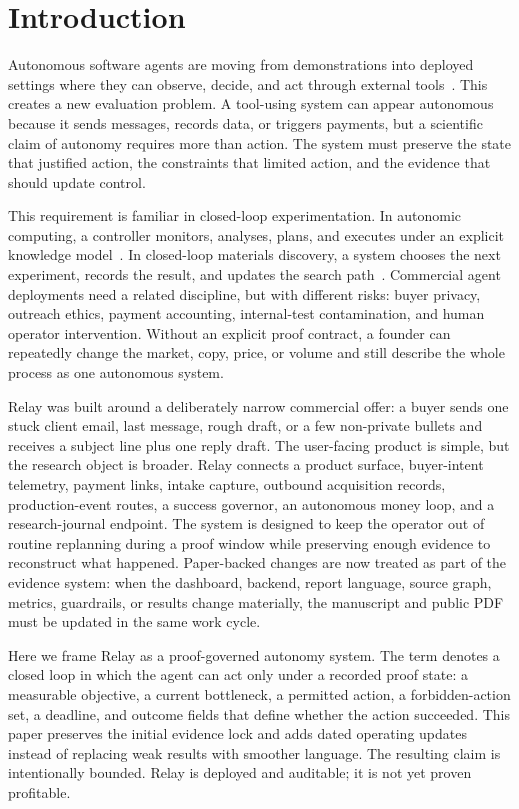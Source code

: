 \documentclass[12pt,letterpaper]{article}
\begin{document}
\section{Introduction}

Autonomous software agents are moving from demonstrations into deployed settings where they can observe, decide, and act through external tools~\cite{yao_react_2023,schick_toolformer_2023,park_generative_2023,wu_autogen_2023,wang_survey_2023}. This creates a new evaluation problem. A tool-using system can appear autonomous because it sends messages, records data, or triggers payments, but a scientific claim of autonomy requires more than action. The system must preserve the state that justified action, the constraints that limited action, and the evidence that should update control.

This requirement is familiar in closed-loop experimentation. In autonomic computing, a controller monitors, analyses, plans, and executes under an explicit knowledge model~\cite{kephart_vision_2003}. In closed-loop materials discovery, a system chooses the next experiment, records the result, and updates the search path~\cite{kusne_closed_loop_2020}. Commercial agent deployments need a related discipline, but with different risks: buyer privacy, outreach ethics, payment accounting, internal-test contamination, and human operator intervention. Without an explicit proof contract, a founder can repeatedly change the market, copy, price, or volume and still describe the whole process as one autonomous system.

Relay was built around a deliberately narrow commercial offer: a buyer sends one stuck client email, last message, rough draft, or a few non-private bullets and receives a subject line plus one reply draft. The user-facing product is simple, but the research object is broader. Relay connects a product surface, buyer-intent telemetry, payment links, intake capture, outbound acquisition records, production-event routes, a success governor, an autonomous money loop, and a research-journal endpoint. The system is designed to keep the operator out of routine replanning during a proof window while preserving enough evidence to reconstruct what happened. Paper-backed changes are now treated as part of the evidence system: when the dashboard, backend, report language, source graph, metrics, guardrails, or results change materially, the manuscript and public PDF must be updated in the same work cycle.

Here we frame Relay as a proof-governed autonomy system. The term denotes a closed loop in which the agent can act only under a recorded proof state: a measurable objective, a current bottleneck, a permitted action, a forbidden-action set, a deadline, and outcome fields that define whether the action succeeded. This paper preserves the initial evidence lock and adds dated operating updates instead of replacing weak results with smoother language. The resulting claim is intentionally bounded. Relay is deployed and auditable; it is not yet proven profitable.
\end{document}
